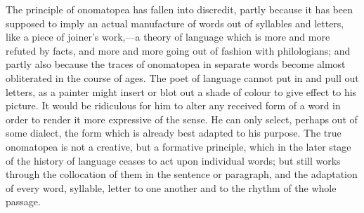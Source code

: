 \documentclass[11pt,letter]{article}
\begin{document}
\par  The principle of onomatopea has fallen into discredit, partly because it has been supposed to imply an actual manufacture of words out of syllables and letters, like a piece of joiner’s work,—a theory of language which is more and more refuted by facts, and more and more going out of fashion with philologians; and partly also because the traces of onomatopea in separate words become almost obliterated in the course of ages. The poet of language cannot put in and pull out letters, as a painter might insert or blot out a shade of colour to give effect to his picture. It would be ridiculous for him to alter any received form of a word in order to render it more expressive of the sense. He can only select, perhaps out of some dialect, the form which is already best adapted to his purpose. The true onomatopea is not a creative, but a formative principle, which in the later stage of the history of language ceases to act upon individual words; but still works through the collocation of them in the sentence or paragraph, and the adaptation of every word, syllable, letter to one another and to the rhythm of the whole passage.
\end{document}
